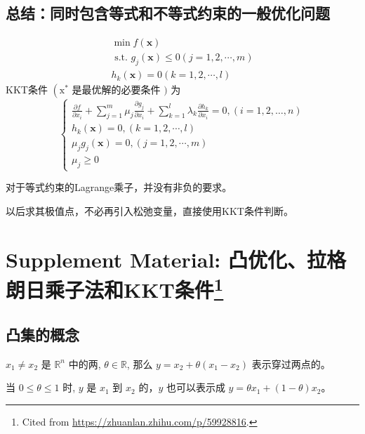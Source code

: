 \subsection{总结：同时包含等式和不等式约束的一般优化问题}

\begin{theorem}[同时包含等式和不等式约束的一般优化问题的KKT条件]
    $$
\begin{array}{l}
\min f(\mathbf{x}) \\
\text { s.t. } g_{j}(\mathbf{x}) \leq 0(j=1,2, \cdots, m) \\
h_{k}(\mathbf{x})=0(k=1,2, \cdots, l)
\end{array}
$$
KKT条件 $ \left(\mathrm{x}^{*}\right. $ 是最优解的必要条件 $ ) $ 为
$$
\left\{\begin{array}{l}
\frac{\partial f}{\partial x_{i}}+\sum_{j=1}^{m} \mu_{j} \frac{\partial g_{j}}{\partial x_{i}}+\sum_{k=1}^{l} \lambda_{k} \frac{\partial h_{k}}{\partial x_{i}}=0,(i=1,2, \ldots, n) \\
h_{k}(\mathbf{x})=0,(k=1,2, \cdots, l) \\
\mu_{j} g_{j}(\mathbf{x})=0,(j=1,2, \cdots, m) \\
\mu_{j} \geq 0
\end{array}\right.
$$
\end{theorem}

\begin{remark}
    对于等式约束的Lagrange乘子，并没有非负的要求。
\end{remark}

\begin{remark}
    以后求其极值点，不必再引入松弛变量，直接使用KKT条件判断。
\end{remark}


\section[Supplement Material: 凸优化、拉格朗日乘子法和KKT条件]{Supplement Material: 凸优化、拉格朗日乘子法和KKT条件\footnote{Cited from \url{https://zhuanlan.zhihu.com/p/59928816}.}}

\subsection{凸集的概念}

\begin{definition}[点、（直）线、线段]
    $ x_{1} \neq x_{2} $ 是 $ \mathbb{R}^{n} $ 中的两, $ \theta \in \mathbb{R} $, 那么 $ y=x_{2}+\theta\left(x_{1}-x_{2}\right) $ 表示穿过两点的。

    当 $ 0 \leqslant \theta \leqslant 1 $ 时, $ y $ 是 $ x_{1} $ 到 $ x_{2} $ 的，$ y $ 也可以表示成 $ y=\theta x_{1}+(1-\theta) x_{2} $。
\end{definition}

